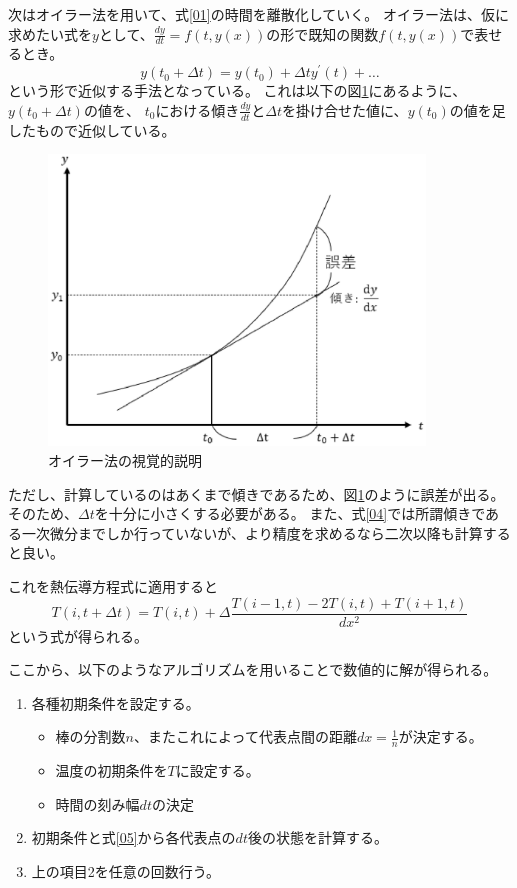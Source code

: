 \documentclass{jsarticle}
\begin{document}
次はオイラー法を用いて、式\ref{01}の時間を離散化していく。
オイラー法は、仮に求めたい式を$y$として、$\frac{dy}{dt} = f(t,y(x))$の形で既知の関数$f(t,y(x))$で表せるとき。
\begin{equation}
	y(t_0+\Delta t) = y(t_0) + \Delta ty^{\prime}(t) + \ldots	\label{04}
\end{equation}
という形で近似する手法となっている。
これは以下の図\ref{fig02}にあるように、$y(t_0+\Delta t)$の値を、
$t_0$における傾き$\frac{dy}{dt}$と$\Delta t$を掛け合せた値に、$y(t_0)$の値を足したもので近似している。
\begin{figure}[H]
	\centering
	\includegraphics[width=10cm]{pic02.eps}
	\caption{オイラー法の視覚的説明}
	\label{fig02}
\end{figure}%
ただし、計算しているのはあくまで傾きであるため、図\ref{fig02}のように誤差が出る。そのため、$\Delta t$を十分に小さくする必要がある。
また、式\ref{04}では所謂傾きである一次微分までしか行っていないが、より精度を求めるなら二次以降も計算すると良い。

これを熱伝導方程式に適用すると
\begin{equation}
	T(i,t+\Delta t) = T(i,t) + \Delta \frac{T(i-1,t) - 2T(i,t) + T(i+1,t)}{dx^2}	\label{05}
\end{equation}
という式が得られる。

ここから、以下のようなアルゴリズムを用いることで数値的に解が得られる。
\begin{enumerate}
	\item 各種初期条件を設定する。
	\begin{itemize}
		\item 棒の分割数$n$、またこれによって代表点間の距離$dx=\frac{1}{n}$が決定する。
		\item 温度の初期条件を$T$に設定する。
		\item 時間の刻み幅$dt$の決定
	\end{itemize}
	\item 初期条件と式\ref{05}から各代表点の$dt$後の状態を計算する。
	\item 上の項目2を任意の回数行う。
\end{enumerate}
\end{document}
